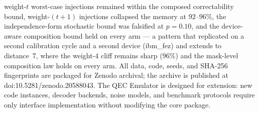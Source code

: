 \documentclass[11pt,a4paper]{article}
\begin{document}
weight-$t$ worst-case injections remained within the composed
correctability bound, weight-$(t{+}1)$ injections collapsed the memory
at $92$--$96\%$, the independence-form stochastic bound was falsified
at $p=0.10$, and the device-aware composition bound held on every arm
--- a pattern that replicated on a second calibration cycle and a second
device (ibm\_fez) and extends to distance~7, where the weight-$4$
cliff remains sharp ($96\%$) and the mask-level composition law holds
on every arm.
All data, code, seeds, and SHA-256 fingerprints are packaged for Zenodo archival; the archive is published at doi:10.5281/zenodo.20588043.
The QEC Emulator is designed for extension: new code instances, decoder
backends, noise models, and benchmark protocols require only interface
implementation without modifying the core package.
\end{document}
